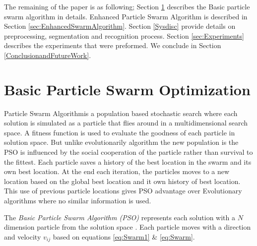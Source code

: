 \documentclass[preprint,1p,times,review]{elsarticle}
\begin{document}

The remaining of the paper is as following; Section
\ref{sec:ParticleSwarmAlgorithm} describes the Basic particle swarm algorithm in
details.  Enhanced Particle Swarm Algorithm is described in Section
\ref{sec:EnhancedSwarmAlgorithm}. Section \ref{Sysdisc} provide details on
preprocessing, segmentation and recognition process. Section
\ref{sec:Experiments} describes the experiments that were preformed. We conclude
in Section \ref{ConclusionandFutureWork}.


\section{Basic Particle Swarm Optimization}
\label{sec:ParticleSwarmAlgorithm}
 
 Particle Swarm Algorithm\cite{PSOFirst}is a population based stochastic search where each solution is simulated as a  particle that flies around in a multidimensional search space. A fitness function is used to evaluate the goodness of each particle in solution space. But unlike evolutionarily algorithm the new population is the PSO is influenced by the social cooperation of the particle rather than survival to the fittest. Each particle saves a history of the best location in the swarm and its own best location.  At the end each iteration, the particles moves to a new location based on the global best location and it own history of best location. This use of previous particle locations gives PSO advantage over Evolutionary algorithms where no similar information is used.

 The \textit{Basic Particle Swarm Algorithm (PSO)} represents each solution with a $N$ dimension particle from the solution space \cite{PSOFirst}. Each particle moves with a direction and velocity $v_{ij}$ based on equations \ref{eq:Swarm1} \& \ref{eq:Swarm}.
\end{document}
